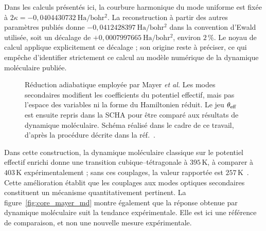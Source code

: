 Dans les calculs présentés ici, la courbure harmonique du mode uniforme est
fixée à $2\kappa=-0{,}0404430732\ \mathrm{Ha/bohr^2}$. La reconstruction à
partir des autres paramètres publiés donne
$-0{,}0412428397\ \mathrm{Ha/bohr^2}$ dans la convention d'Ewald utilisée,
soit un décalage de $+0{,}0007997665\ \mathrm{Ha/bohr^2}$, environ $2\,\%$.
Le noyau de calcul applique explicitement ce décalage ; son origine reste à
préciser, ce qui empêche d'identifier strictement ce calcul au modèle numérique
de la dynamique moléculaire publiée.

\begin{figure}[H]
\centering
{}
\caption{Réduction adiabatique employée par Mayer \emph{et al.} Les modes
secondaires modifient les coefficients du potentiel effectif, mais pas l'espace
des variables ni la forme du Hamiltonien réduit. Le jeu $\theta_{\rm eff}$ est
ensuite repris dans la SCHA pour être comparé aux résultats de dynamique
moléculaire. Schéma réalisé dans le cadre de ce travail, d'après la procédure
décrite dans la réf.~\cite{Mayer2022}.}
\label{fig:core_mayer_reduction}
\end{figure}

Dans cette construction, la dynamique moléculaire classique sur le potentiel
effectif enrichi donne une transition cubique--tétragonale à $395\,\mathrm K$,
à comparer à $403\,\mathrm K$ expérimentalement ; sans ces couplages, la valeur
rapportée est $257\,\mathrm K$~\cite{Mayer2022}. Cette amélioration établit que
les couplages aux modes optiques secondaires constituent un mécanisme
quantitativement pertinent. La figure~\ref{fig:core_mayer_md} montre également
que la réponse obtenue par dynamique moléculaire suit la tendance expérimentale.
Elle est ici une référence de comparaison, et non une nouvelle mesure
expérimentale.

